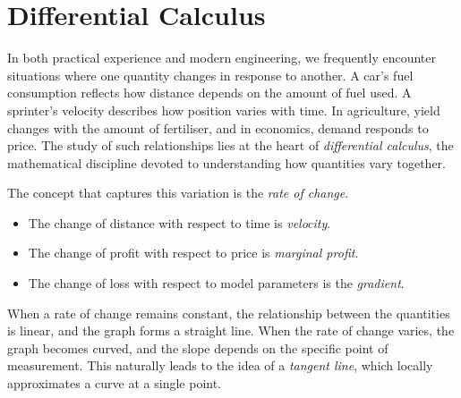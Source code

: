 \chapter{Differential Calculus}
\label{chap:ch10}

In both practical experience and modern engineering, we frequently encounter situations where one quantity changes in response to another. A car’s fuel consumption reflects how distance depends on the amount of fuel used. A sprinter’s velocity describes how position varies with time. In agriculture, yield changes with the amount of fertiliser, and in economics, demand responds to price. The study of such relationships lies at the heart of \emph{differential calculus}, the mathematical discipline devoted to understanding how quantities vary together.

The concept that captures this variation is the \emph{rate of change}.

\begin{itemize}
\item The change of distance with respect to time is \emph{velocity}.
\item The change of profit with respect to price is \emph{marginal profit}.
\item The change of loss with respect to model parameters is the \emph{gradient}.
\end{itemize}

When a rate of change remains constant, the relationship between the quantities is linear, and the graph forms a straight line. When the rate of change varies, the graph becomes curved, and the slope depends on the specific point of measurement. This naturally leads to the idea of a \emph{tangent line}, which locally approximates a curve at a single point.



